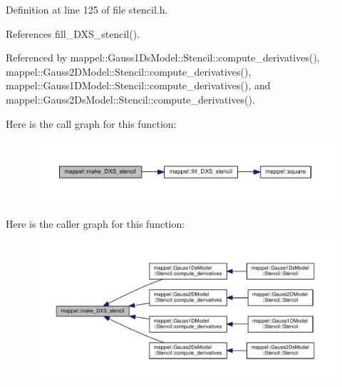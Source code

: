 Definition at line 125 of file stencil.\+h.



References fill\+\_\+\+D\+X\+S\+\_\+stencil().



Referenced by mappel\+::\+Gauss1\+Ds\+Model\+::\+Stencil\+::compute\+\_\+derivatives(), mappel\+::\+Gauss2\+D\+Model\+::\+Stencil\+::compute\+\_\+derivatives(), mappel\+::\+Gauss1\+D\+Model\+::\+Stencil\+::compute\+\_\+derivatives(), and mappel\+::\+Gauss2\+Ds\+Model\+::\+Stencil\+::compute\+\_\+derivatives().



Here is the call graph for this function\+:\nopagebreak
\begin{figure}[H]
\begin{center}
\leavevmode
\includegraphics[width=350pt]{namespacemappel_af7636db506977133c8b30d108fede711_cgraph}
\end{center}
\end{figure}




Here is the caller graph for this function\+:\nopagebreak
\begin{figure}[H]
\begin{center}
\leavevmode
\includegraphics[width=350pt]{namespacemappel_af7636db506977133c8b30d108fede711_icgraph}
\end{center}
\end{figure}


